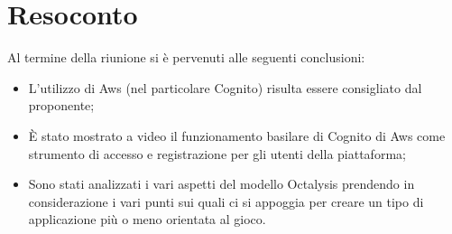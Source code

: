 \documentclass[a4paper, oneside, openany, dvipsnames, table]{article}
\begin{document}
\section{Resoconto}
Al termine della riunione si è pervenuti alle seguenti conclusioni:	
\begin{itemize}
	\item  L'utilizzo di Aws (nel particolare Cognito) risulta essere consigliato dal proponente;
	\item È stato mostrato a video il funzionamento basilare di Cognito di Aws come strumento di accesso e registrazione per gli utenti della piattaforma;
	\item Sono stati analizzati i vari aspetti del modello Octalysis prendendo in considerazione i vari punti sui quali ci si appoggia per creare un tipo di applicazione più o meno orientata al gioco.
\end{itemize}
\newpage
\end{document}
